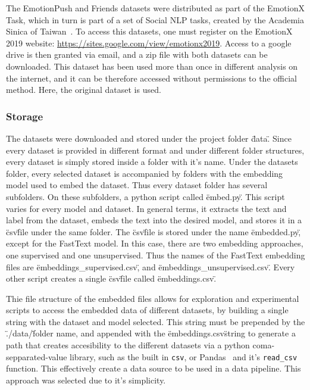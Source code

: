 The EmotionPush and Friends datasets were distributed as part of the EmotionX Task, which in turn is part of a set of Social NLP tasks, created by the Academia Sinica of Taiwan~\cite{chen2018emotionlines}. To access this datasets, one must register on the EmotionX 2019 website: \url{https://sites.google.com/view/emotionx2019}. Access to a google drive is then granted via email, and a zip file with both datasets can be downloaded. This dataset has been used more than once in different analysis on the internet, and it can be therefore accessed without permissions to the official method. Here, the original dataset is used.

\subsubsection{Storage}\label{subs:Storage}
The datasets were downloaded and stored under the project folder \"data\". Since every dataset is provided in different format and under different folder structures, every dataset is simply stored inside a folder with it's name.
Under the datasets folder, every selected dataset is accompanied by folders with the embedding model used to embed the dataset. Thus every dataset folder has several subfolders. On these subfolders, a python script called \"embed.py\". This script varies for every model and dataset. In general terms, it extracts the text and label from the dataset, embeds the text into the desired model, and stores it in a \"csv\" file under the same folder.
The \"csv\" file is stored under the name \"embedded.py\", except for the FastText model. In this case, there are two embedding approaches, one supervised and one unsupervised. Thus the names of the FastText embedding files are \"embeddings_supervised.csv\", and \"embeddings_unsupervised.csv\". Every other script creates a single \"csv\" file called \"embeddings.csv\".

Thie file structure of the embedded files allows for exploration and experimental scripts to access the embedded data of different datasets, by building a single string with the dataset and model selected. This string must be prepended by the \"./data/\" folder name, and appended with the \"embeddings.csv\" string to generate a path that creates accesibility to the different datasets via a python coma-sepparated-value library, such as the built in \lstinline{csv}, or Pandas~\cite{reback2020pandas} and it's \lstinline{read_csv} function. This effectively create a data source to be used in a data pipeline. This approach was selected due to it's simplicity.

